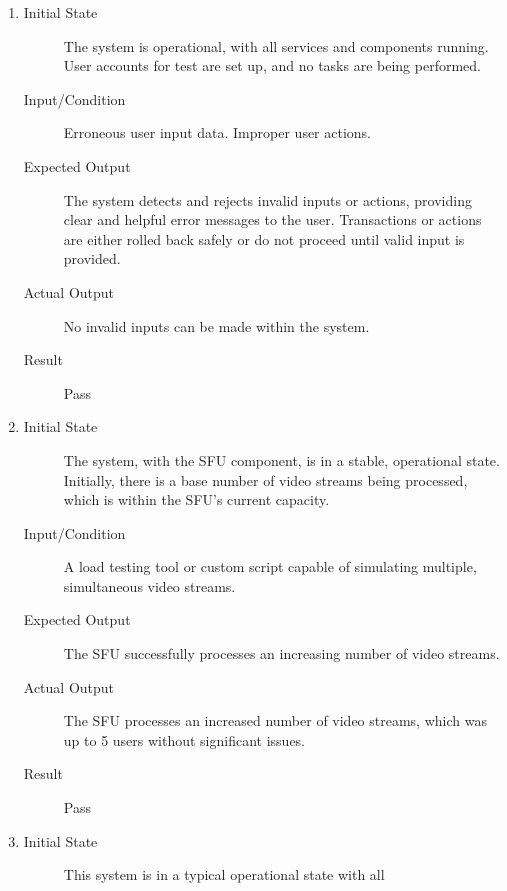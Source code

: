 \documentclass[12pt, titlepage]{article}
\begin{document}
\begin{enumerate}[NFR-T1]
  \item \label{NFRT4}
    \begin{description}
    \item[Initial State] The system is operational, with all services and components
      running. User accounts for test are set up, and no tasks are being
      performed.
    \item[Input/Condition] Erroneous user input data. Improper user actions.
    \item[Expected Output] The system detects and rejects invalid inputs or actions,
      providing clear and helpful error messages to the user. Transactions or
      actions are either rolled back safely or do not proceed until valid input is
      provided.
    \item[Actual Output] No invalid inputs can be made within the system.
    \item[Result] Pass 
    \end{description}
  \item \label{NFRT6}
    \begin{description}
    \item[Initial State] The system, with the SFU component, is in a stable,
      operational state. Initially, there is a base number of video streams being
      processed, which is within the SFU's current capacity.
    \item[Input/Condition] A load testing tool or custom script capable of simulating
      multiple, simultaneous video streams.
    \item[Expected Output] The SFU successfully processes an increasing number of video
      streams.
    \item[Actual Output] The SFU processes an increased number of video streams, which was up
    to 5 users without significant issues.
    \item[Result] Pass 
    \end{description}
  \item \label{NFRT7}
    \begin{description}
    \item[Initial State] This system is in a typical operational state with all

\end{description}
\end{enumerate}
\end{document}
